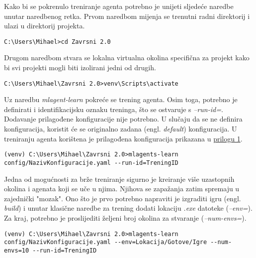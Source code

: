 \documentclass[]{foi} %
\begin{document}
Kako bi se pokrenulo treniranje agenta potrebno je unijeti sljedeće naredbe unutar naredbenog retka. Prvom naredbom mijenja se trenutni radni direktorij i ulazi u direktorij projekta.

\begin{lstlisting}[style=cmd, numbers=none, caption={Promjena direktorija}]
C:\Users\Mihael>cd Zavrsni 2.0
\end{lstlisting}

Drugom naredbom stvara se lokalna virtualna okolina specifična za projekt kako bi svi projekti mogli biti izolirani jedni od drugih.

\begin{lstlisting}[style=cmd, numbers=none, caption={Kreiranje virtualne okoline}]
C:\Users\Mihael\Zavrsni 2.0>venv\Scripts\activate
\end{lstlisting}

Uz naredbu \textit{mlagent-learn} pokreće se trening agenta. Osim toga, potrebno je definirati i identifikacijsku oznaku treninga, što se ostvaruje s \textit{--run-id=}. Dodavanje prilagođene konfiguracije nije potrebno. U slučaju da se ne definira konfiguracija, koristit će se originalno zadana (engl. \textit{default}) konfiguracija. U treniranju agenta korištena je prilagođena konfiguracija prikazana u \hyperref[cha: prilog 1]{prilogu 1}.

\begin{lstlisting}[style=cmd, numbers=none, caption={Pokretanje treninga agenta uz prilago\dj{}enu konfiguraciju}]
(venv) C:\Users\Mihael\Zavrsni 2.0>mlagents-learn config/NazivKonfiguracije.yaml --run-id=TreningID
\end{lstlisting}

Jedna od mogućnosti za brže treniranje sigurno je kreiranje više uzastopnih okolina i agenata koji se uče u njima. Njihova se zapažanja zatim spremaju u zajednički "mozak". Ono što je prvo potrebno napraviti je izgraditi igru (engl. \textit{build}) i unutar klasične naredbe za trening dodati lokaciju \textit{.exe} datoteke (\textit{--env=}). Za kraj, potrebno je proslijediti željeni broj okolina za stvaranje (\textit{--num-envs=}).

\begin{lstlisting}[style=cmd, numbers=none, caption={Poseban trening uz vi\v{s}e okolina}]
(venv) C:\Users\Mihael\Zavrsni 2.0>mlagents-learn config/NazivKonfiguracije.yaml --env=Lokacija/Gotove/Igre --num-envs=10 --run-id=TreningID
\end{lstlisting}
\end{document}
